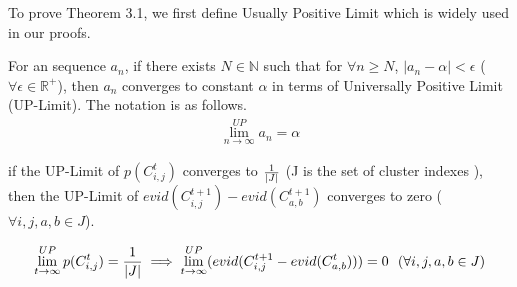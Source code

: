 To prove Theorem 3.1, we first define Usually Positive Limit which is widely used in our proofs. 
\begin{definition}
\label{def:up-limit}
For an sequence $a_n$, if there exists $N \in \mathbb{N}$ such that 
for $\forall n \geq N$, $|a_n-\alpha| < \epsilon$ ($\forall \epsilon \in \mathbb{R}^+$), 
then $a_n$ converges to constant $\alpha$ in terms of Universally Positive Limit (UP-Limit).
The notation is as follows. 
\begin{align}
    \lim^{UP}_{n \rightarrow \infty}a_n=\alpha  
\end{align}
\end{definition}

\begin{lemma}
\label{lem:adj_convergence}
if the UP-Limit of $p(C^t_{i,j})$ converges to ${1 \over |J|}$ (J is the set of cluster indexes ),
then the UP-Limit of $evid(C^{t+1}_{i,j})-evid(C^{t+1}_{a,b})$ converges to zero
($\forall i,j, a, b \in J$). 

\begin{align}
    \begin{split}
        \lim^{UP}_{t \rightarrow \infty}p(C^{t}_{i,j})={1 \over |J|} \implies
        \lim^{UP}_{t \rightarrow \infty}(evid(C^{t+1}_{i,j}-evid(C^{t}_{a,b})))=0
        \ \ (\forall i,j,a,b \in J)
    \end{split}
\end{align}
\end{lemma}
